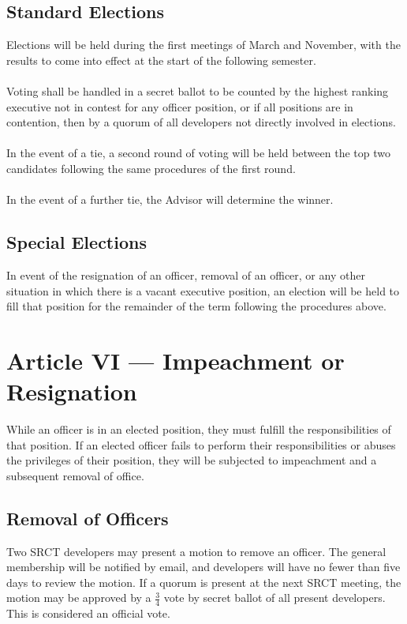 \documentclass{article}
\begin{document}
  \subsection{Standard Elections}
  Elections will be held during the first meetings of March and 
  November, with the results to come into effect at the start 
  of the following semester.
  \\ \\
  Voting shall be handled in a secret ballot to be counted by the 
  highest ranking executive not in contest for any officer position, or if
  all positions are in contention, then by a quorum of all developers
  not directly involved in elections.
  \\ \\
  In the event of a tie, a second round of voting will be held between 
  the top two candidates following the same procedures of the first 
  round.
  \\ \\
  In the event of a further tie, the Advisor will determine the winner.
  
  \subsection{Special Elections}
  In event of the resignation of an officer, removal of an officer, or 
  any other situation in which there is a vacant executive position,
  an election will be held to fill that position for the remainder of 
  the term following the procedures above.


  \section{Article VI --- Impeachment or Resignation}
  While an officer is in an elected position, they must fulfill the 
  responsibilities of that position. If an elected officer fails to 
  perform their responsibilities or abuses the privileges of their 
  position, they will be subjected to impeachment and a subsequent 
  removal of office.
  
  \subsection{Removal of Officers}
  Two SRCT developers may present a motion to remove an officer. The general
  membership will be notified by email, and developers will have no fewer
  than five days to review the motion. If a quorum is present at the next
  SRCT meeting, the motion may be approved by a $\frac{3}{4}$ vote by secret 
  ballot of all present developers. This is considered an official vote.
\end{document}
